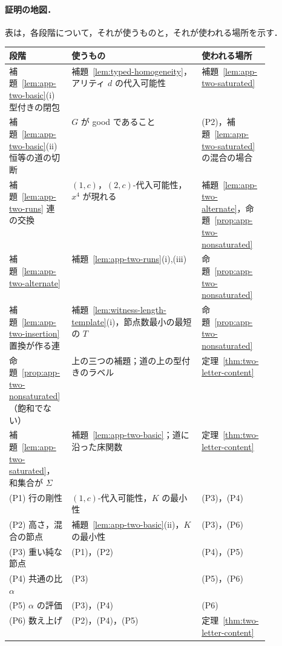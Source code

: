 \paragraph{証明の地図．}
表は，各段階について，それが使うものと，それが使われる場所を示す．
\begin{center}
\footnotesize
\setlength{\tabcolsep}{3pt}
\renewcommand{\arraystretch}{1.15}
\begin{tabularx}{\linewidth}{@{}>{\raggedright\arraybackslash}p{0.24\linewidth}>{\raggedright\arraybackslash}X>{\raggedright\arraybackslash}p{0.26\linewidth}@{}}
\hline
段階 & 使うもの & 使われる場所\\
\hline
補題~\ref{lem:app-two-basic}(i) 型付きの閉包
 & 補題~\ref{lem:typed-homogeneity}，アリティ $d$ の代入可能性
 & 補題~\ref{lem:app-two-saturated}\\
補題~\ref{lem:app-two-basic}(ii) 恒等の道の切断
 & $G$ が good であること
 & (P2)，補題~\ref{lem:app-two-saturated} の混合の場合\\
補題~\ref{lem:app-two-runs} 連の交換
 & $(1,c)$，$(2,c)$-代入可能性，$x^4$ が現れる
 & 補題~\ref{lem:app-two-alternate}，命題~\ref{prop:app-two-nonsaturated}\\
補題~\ref{lem:app-two-alternate}
 & 補題~\ref{lem:app-two-runs}(i),(iii)
 & 命題~\ref{prop:app-two-nonsaturated}\\
補題~\ref{lem:app-two-insertion} 置換が作る連
 & 補題~\ref{lem:witness-length-template}(i)，節点数最小の最短の $T$
 & 命題~\ref{prop:app-two-nonsaturated}\\
命題~\ref{prop:app-two-nonsaturated}（飽和でない）
 & 上の三つの補題；道の上の型付きのラベル
 & 定理~\ref{thm:two-letter-content}\\
補題~\ref{lem:app-two-saturated}，和集合が $\Sigma$
 & 補題~\ref{lem:app-two-basic}；道に沿った床関数
 & 定理~\ref{thm:two-letter-content}\\
(P1) 行の剛性
 & $(1,c)$-代入可能性，$K$ の最小性
 & (P3)，(P4)\\
(P2) 高さ，混合の節点
 & 補題~\ref{lem:app-two-basic}(ii)，$K$ の最小性
 & (P3)，(P6)\\
(P3) 重い純な節点
 & (P1)，(P2)
 & (P4)，(P5)\\
(P4) 共通の比 $\alpha$
 & (P3)
 & (P5)，(P6)\\
(P5) $\alpha$ の評価
 & (P3)，(P4)
 & (P6)\\
(P6) 数え上げ
 & (P2)，(P4)，(P5)
 & 定理~\ref{thm:two-letter-content}\\
\hline
\end{tabularx}
\end{center}

